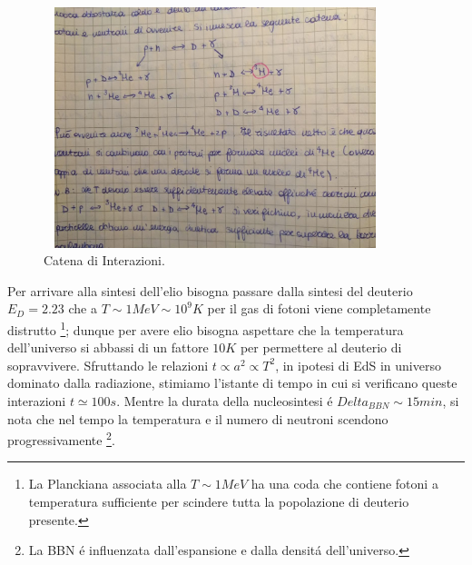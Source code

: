 \documentclass[12pt, a4paper]{article}
\begin{document}
\begin{figure}[htp]
    \centering
    \includegraphics[width=10cm, height=7cm]{images/catena.jpeg}
    \caption{Catena di Interazioni.}
    \label{fig:Int}
\end{figure}
Per arrivare alla sintesi dell'elio bisogna passare dalla sintesi del deuterio $E_D=2.23$ che a $T \sim 1MeV \sim 10^9 K$ per il gas di fotoni viene completamente distrutto \footnote{La Planckiana associata alla $T \sim 1MeV$ ha una coda che contiene fotoni a temperatura sufficiente per scindere tutta la popolazione di deuterio presente.}; dunque per avere elio bisogna aspettare che la temperatura dell'universo si abbassi di un fattore $10K$ per permettere al deuterio di sopravvivere. Sfruttando le relazioni $t \propto a^2 \propto T^2$, in ipotesi di EdS in universo dominato dalla radiazione, stimiamo l'istante di tempo in cui si verificano queste interazioni $t\simeq 100 s$. Mentre la durata della nucleosintesi \'{e} $Delta_{BBN}\sim 15 min$, si nota che nel tempo la temperatura e il numero di neutroni scendono progressivamente \footnote{La BBN \'{e} influenzata dall'espansione e dalla densit\'{a} dell'universo.}.
\end{document}
